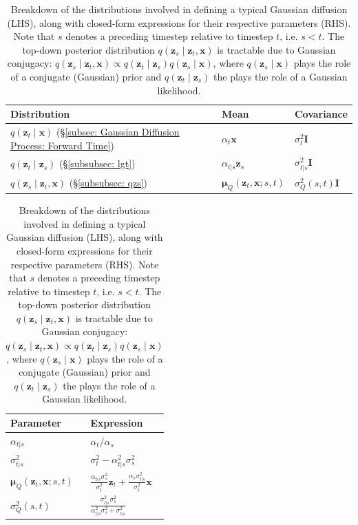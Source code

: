 %
\newpage
\begin{table}[!t]
    \centering
    \begin{tabular}{lll}
        \toprule
        Distribution & Mean & Covariance \\
        \midrule
        $q(\mathbf{z}_t \mid \mathbf{x})$ (\S\ref{subsec: Gaussian Diffusion Process: Forward Time})&  $\alpha_t \mathbf{x}$ &  $\sigma_t^2\mathbf{I}$ \\[2pt]
        $q(\mathbf{z}_t \mid \mathbf{z}_s)$ (\S\ref{subsubsec: lgt}) & $\alpha_{t|s} \mathbf{z}_s$ & $\sigma_{t|s}^2\mathbf{I}$ \\[2pt]
        $q(\mathbf{z}_s \mid \mathbf{z}_t, \mathbf{x})$ (\S\ref{subsubsec: qzs}) & $\boldsymbol{\mu}_Q(\mathbf{z}_t, \mathbf{x}; s, t)$ &  $\sigma^2_Q(s,t)\mathbf{I}$ \\[2pt]
        \bottomrule
    \end{tabular}
    \hspace{20pt}
    \begin{tabular}{ll}
        \toprule
        Parameter & Expression \\
        \midrule
        $\alpha_{t|s}$ & $\alpha_t / \alpha_s$ \\[5pt]
        $\sigma^2_{t|s}$ & $\sigma^2_t - \alpha_{t|s}^2 \sigma_s^2$ \\[5pt]
        $\boldsymbol{\mu}_Q(\mathbf{z}_t, \mathbf{x}; s, t)$ & $\displaystyle\frac{\alpha_{t|s}\sigma_s^2}{\sigma^2_{t}}\mathbf{z}_t + \frac{\alpha_s \sigma^2_{t|s}}{\sigma_{t}^2}\mathbf{x}$ \\[5pt]
        $\sigma^2_Q(s,t)$ & $\displaystyle \frac{\sigma_{t|s}^2\sigma_s^2}{\alpha_{t|s}^2 \sigma_s^2 + \sigma_{t|s}^2}$ \\[5pt]
        \bottomrule
    \end{tabular}
    \caption{Breakdown of the distributions involved in defining a typical Gaussian diffusion (LHS), along with closed-form expressions for their respective parameters (RHS). Note that $s$ denotes a preceding timestep relative to timestep $t$, i.e. $s < t$. The top-down posterior distribution $q(\mathbf{z}_s \mid \mathbf{z}_t, \mathbf{x})$ is tractable due to Gaussian conjugacy: $q(\mathbf{z}_s \mid \mathbf{z}_t, \mathbf{x}) \propto q(\mathbf{z}_t \mid \mathbf{z}_s) q(\mathbf{z}_s \mid \mathbf{x}) $, where $q(\mathbf{z}_s \mid \mathbf{x})$ plays the role of a conjugate (Gaussian) prior and $q(\mathbf{z}_t \mid \mathbf{z}_s)$ the plays the role of a Gaussian likelihood.}
    \label{tab: dist_params}
\end{table}
